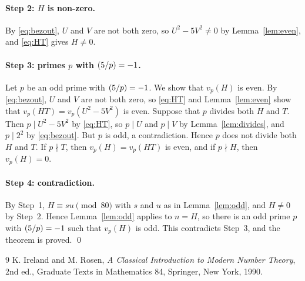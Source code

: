 \documentclass[11pt]{article}
\newcommand{\leg}[2]{\mathchoice{\biggl(\dfrac{#1}{#2}\biggr)}{(#1/#2)}{(#1/#2)}{(#1/#2)}}
\begin{document}
\paragraph{Step 2: $H$ is non-zero.} By \eqref{eq:bezout}, $U$ and $V$ are not both zero, so $U^2-5V^2\neq0$ by Lemma~\ref{lem:even}, and \eqref{eq:HT} gives $H\neq0$.

\paragraph{\texorpdfstring{Step 3: primes $p$ with $\leg{5}{p}=-1$.}{Step 3: inert primes.}} Let $p$ be an odd prime with $\leg{5}{p}=-1$. We show that $v_p(H)$ is even. By \eqref{eq:bezout}, $U$ and $V$ are not both zero, so \eqref{eq:HT} and Lemma~\ref{lem:even} show that $v_p(HT)=v_p(U^2-5V^2)$ is even. Suppose that $p$ divides both $H$ and $T$. Then $p\mid U^2-5V^2$ by \eqref{eq:HT}, so $p\mid U$ and $p\mid V$ by Lemma~\ref{lem:divides}, and $p\mid 2^{2}$ by \eqref{eq:bezout}. But $p$ is odd, a contradiction. Hence $p$ does not divide both $H$ and $T$. If $p\nmid T$, then $v_p(H)=v_p(HT)$ is even, and if $p\nmid H$, then $v_p(H)=0$.

\paragraph{Step 4: contradiction.} By Step~1, $H\equiv su\pmod{80}$ with $s$ and $u$ as in Lemma~\ref{lem:odd}, and $H\neq0$ by Step~2. Hence Lemma~\ref{lem:odd} applies to $n=H$, so there is an odd prime $p$ with $\leg{5}{p}=-1$ such that $v_p(H)$ is odd. This contradicts Step~3, and the theorem is proved.
\qed

\begin{thebibliography}{9}
 K. Ireland and M. Rosen, \emph{A Classical Introduction to Modern Number Theory}, 2nd ed., Graduate Texts in Mathematics 84, Springer, New York, 1990.
\end{thebibliography}
\end{document}
